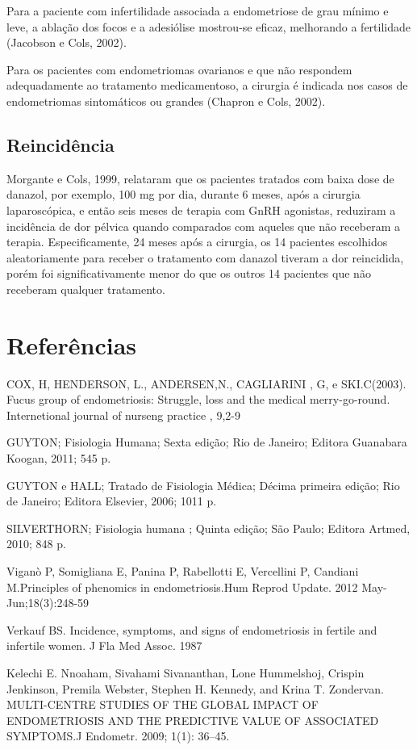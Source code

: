 \documentclass[12pt]{article} %
\begin{document}
Para a paciente com infertilidade associada a endometriose de grau
mínimo e leve, a ablação dos focos e a adesiólise mostrou-se eficaz,
melhorando a fertilidade (Jacobson e Cols, 2002).

Para os pacientes com endometriomas ovarianos e que não respondem
adequadamente ao tratamento medicamentoso, a cirurgia é indicada nos
casos de endometriomas sintomáticos ou grandes (Chapron e Cols, 2002).

\subsection{Reincidência}

Morgante e Cols, 1999, relataram que os pacientes tratados com baixa
dose de danazol, por exemplo, 100 mg por dia, durante 6 meses, após a
cirurgia laparoscópica, e então seis meses de terapia com GnRH
agonistas, reduziram a incidência de dor pélvica quando comparados com
aqueles que não receberam a terapia. Especificamente, 24 meses após a
cirurgia, os 14 pacientes escolhidos aleatoriamente para receber o
tratamento com danazol tiveram a dor reincidida, porém foi
significativamente menor do que os outros 14 pacientes que não
receberam qualquer tratamento.

\section{Referências} 

COX, H, HENDERSON, L., ANDERSEN,N., CAGLIARINI , G, e SKI.C(2003). Fucus group of endometriosis: Struggle, loss and the medical merry-go-round. Internetional journal of nurseng practice , 9,2-9

GUYTON; Fisiologia Humana; Sexta edição; Rio de Janeiro; Editora Guanabara
Koogan, 2011; 545 p.

GUYTON e HALL; Tratado de Fisiologia Médica; Décima primeira edição; Rio de
Janeiro; Editora Elsevier, 2006; 1011 p.

SILVERTHORN; Fisiologia humana ; Quinta edição; São Paulo; Editora Artmed, 2010; 848 p.

Viganò P, Somigliana E, Panina P, Rabellotti E, Vercellini P, Candiani M.Principles of phenomics in endometriosis.Hum Reprod Update. 2012 May-Jun;18(3):248-59

Verkauf BS. Incidence, symptoms, and signs of endometriosis in fertile and infertile women. J Fla Med Assoc. 1987

Kelechi E. Nnoaham, Sivahami Sivananthan, Lone Hummelshoj, Crispin Jenkinson, Premila Webster, Stephen H. Kennedy, and Krina T. Zondervan. MULTI-CENTRE STUDIES OF THE GLOBAL IMPACT OF ENDOMETRIOSIS AND THE PREDICTIVE VALUE OF ASSOCIATED SYMPTOMS.J Endometr. 2009; 1(1): 36–45. 
\end{document}
